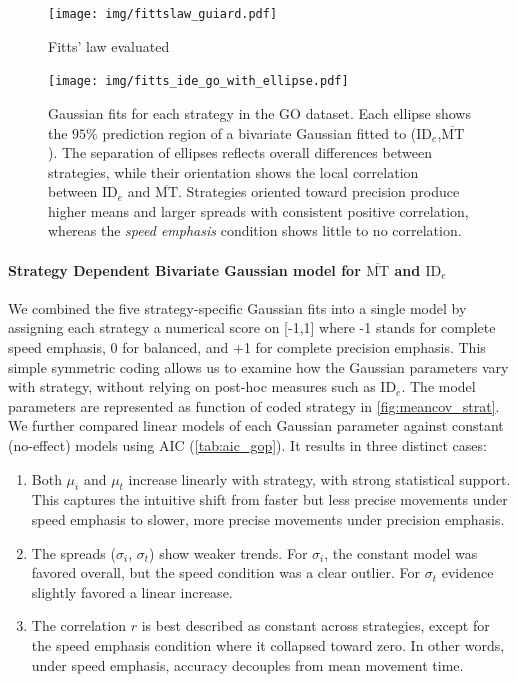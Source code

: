 \documentclass[acmlarge, manuscript,review]{acmart}
\newcommand{\mmt}{\ensuremath{\overline{\mt}}\xspace}
\newcommand{\mt}{\ensuremath{{\text{MT}}}\xspace}
\newcommand{\ide}{\ensuremath{{\text{ID}_e}}\xspace}
\begin{document}
\begin{figure}[htbp]
	\centering
	\texttt{[image: img/fittslaw\_guiard.pdf]}
	\caption{Fitts' law evaluated }
	\label{fig:fittslaw_guiard}
\end{figure}





\begin{figure}[htbp]
	\centering
	\texttt{[image: img/fitts\_ide\_go\_with\_ellipse.pdf]}
	\caption{Gaussian fits for each strategy in the GO dataset. Each ellipse shows the $95\%$ prediction region of a bivariate Gaussian fitted to (\ide,\mmt). The separation of ellipses reflects overall differences between strategies, while their orientation shows the local correlation between \ide and \mmt. Strategies oriented toward precision produce higher means and larger spreads with consistent positive correlation, whereas the \textit{speed emphasis} condition shows little to no correlation.}
	\label{fig:go_ide}
\end{figure}



\paragraph{Strategy Dependent Bivariate Gaussian model for \mmt and \ide}
We combined the five strategy-specific Gaussian fits into a single model by assigning each strategy a numerical score on [-1,1] where -1 stands for complete speed emphasis, 0 for balanced, and +1 for complete precision emphasis. This simple symmetric coding allows us to examine how the Gaussian parameters vary with strategy, without relying on post-hoc measures such as \ide. The model parameters are represented as function of coded strategy in \autoref{fig:meancov_strat}. We further compared linear models of each Gaussian parameter against constant (no-effect) models using AIC (\autoref{tab:aic_gop}). It results in three distinct cases:
\begin{enumerate}
	\item Both $\mu_i$ and $\mu_t$ increase linearly with strategy, with strong statistical support. This captures the intuitive shift from faster but less precise movements under speed emphasis to slower, more precise movements under precision emphasis.
	\item The spreads ($\sigma_i$, $\sigma_t$) show weaker trends. For $\sigma_i$, the constant model was favored overall, but the speed condition was a clear outlier. For $\sigma_t$ evidence slightly favored a linear increase.
	\item The correlation $r$ is best described as constant across strategies, except for the speed emphasis condition where it collapsed toward zero. In other words, under speed emphasis, accuracy decouples from mean movement time.
\end{enumerate}
\end{document}
